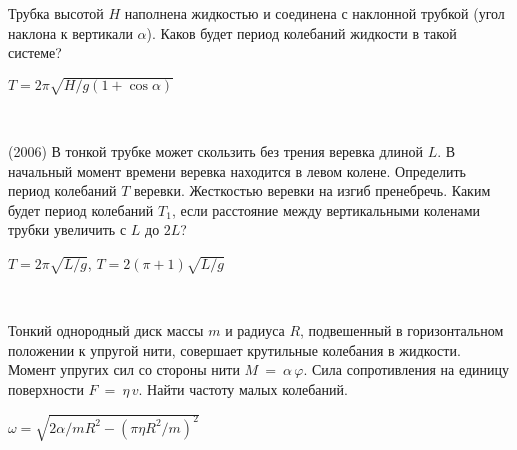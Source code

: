 \begin{ex}
Трубка высотой $H$ наполнена жидкостью и соединена с наклонной трубкой (угол наклона к вертикали $\alpha$). Каков будет период колебаний жидкости в такой системе?
\begin{ans}
$T=2\pi \sqrt{H/g(1+\cos \alpha)}$
\end{ans}
\end{ex}

\begin{ex}
\hspace{0pt} \\
\begin{minipage}{.65\textwidth} 
(2006) В тонкой трубке может скользить без трения веревка длиной $L$. В начальный момент времени веревка находится в левом колене. 
Определить период колебаний $T$ веревки. Жесткостью веревки на изгиб пренебречь. 
Каким будет период колебаний $T_1$, если расстояние между вертикальными коленами трубки увеличить с $L$ до $2L$?
\end{minipage}
\begin{minipage}{.35\textwidth}
\centering

\end{minipage}
\begin{ans}
$T=2\pi\sqrt{L/g}$, $T=2(\pi+1)\sqrt{L/g}$
\end{ans}
\end{ex}

\begin{samepage}
\begin{ex}
\hspace{0pt} \\
\begin{minipage}{.65\textwidth} 
Тонкий однородный диск массы $m$ и радиуса $R$, подвешенный в горизонтальном положении к упругой нити, совершает крутильные колебания в жидкости. 
Момент упругих сил со стороны нити $M~=~\alpha\,\varphi$.  Сила сопротивления на единицу поверхности $F~=~\eta\,v$. Найти частоту малых колебаний.
\end{minipage}
\begin{minipage}{.35\textwidth}
\centering

\end{minipage}
\begin{ans}
$\omega = \sqrt{2\alpha/mR^2-(\pi \eta R^2/m)^2}$
\end{ans}
\end{ex}
\end{samepage}

